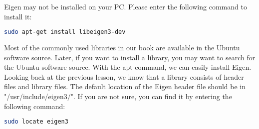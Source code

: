 Eigen may not be installed on your PC. Please enter the following command to install it:

\begin{lstlisting}[language=sh,caption=Terminal input:]
sudo apt-get install libeigen3-dev
\end{lstlisting}

Most of the commonly used libraries in our book are available in the Ubuntu software source. Later, if you want to install a library, you may want to search for the Ubuntu software source. With the apt command, we can easily install Eigen. Looking back at the previous lesson, we know that a library consists of header files and library files. The default location of the Eigen header file should be in "/usr/include/eigen3/". If you are not sure, you can find it by entering the following command:

\begin{lstlisting}[language=sh,caption=Terminal input:]
sudo locate eigen3
\end{lstlisting}

